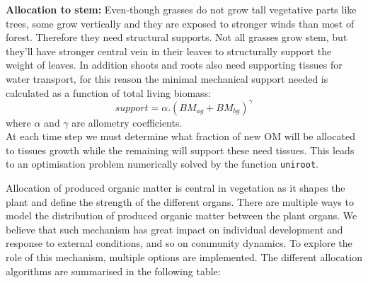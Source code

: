 \documentclass[a4paper,twoside, justified,marginals=raggedright, nobib]{tufte-handout}
\begin{document}
\textbf{Allocation to stem:} Even-though grasses do not grow tall vegetative parts like trees, some grow vertically and they are exposed to stronger winds than most of forest. Therefore they need structural supports. Not all grasses grow stem, but they'll have stronger central vein in their leaves to structurally support the weight of leaves. In addition shoots and roots also need supporting tissues for water transport, for this reason the minimal mechanical support needed is calculated as a function of total living biomass:
\begin{equation}
support = \alpha . (BM_{ag} + BM_{bg})^\gamma
\end{equation}
where $\alpha$ and $\gamma$ are allometry coefficients.\\

\indent At each time step we must determine what fraction of new OM will be allocated to tissues growth while the remaining will support these need tissues. This leads to an optimisation problem numerically solved by the function \texttt{uniroot}.	 

\indent Allocation of produced organic matter is central in vegetation as it shapes the plant and define the strength of the different organs. There are multiple ways to model the distribution of produced organic matter between the plant organs. We believe that such mechanism has great impact on individual development and response to external conditions, and so on community dynamics. To explore the role of this mechanism, multiple options are implemented. The different allocation algorithms are summarised in the following table:
\end{document}
